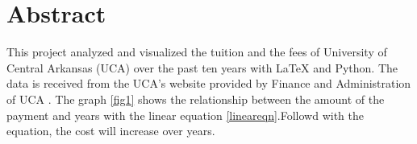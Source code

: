 \section{Abstract}
This project analyzed and visualized the tuition and the fees of University of Central Arkansas (UCA) over the past ten years with LaTeX and Python. The data is received from the UCA's website provided by Finance and Administration of UCA \cite{web:lang:stats}. The graph \ref{fig1} shows the relationship between the amount of the payment and years with the linear equation \ref{lineareqn}.Followd with the equation, the cost will increase over years.
